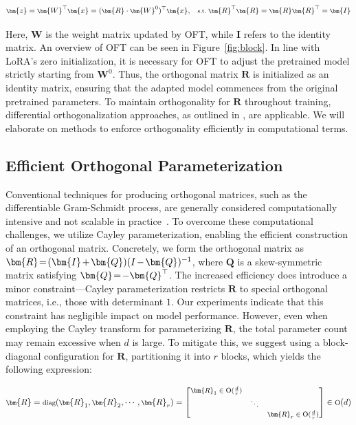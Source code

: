 \begin{equation}\label{eq:oft_general}
    \footnotesize
    \bm{z} = \bm{W}^\top \bm{x} = (\bm{R} \cdot \bm{W}^0)^\top \bm{x},~~~\text{s.t.}~\bm{R}^\top\bm{R} = \bm{R}\bm{R}^\top = \bm{I}
\end{equation}

Here, $\bm{W}$ is the weight matrix updated by OFT, while $\bm{I}$ refers to the identity matrix. An overview of OFT can be seen in Figure~\ref{fig:block}. In line with LoRA’s zero initialization, it is necessary for OFT to adjust the pretrained model strictly starting from $\bm{W}^0$. Thus, the orthogonal matrix $\bm{R}$ is initialized as an identity matrix, ensuring that the adapted model commences from the original pretrained parameters. To maintain orthogonality for $\bm{R}$ throughout training, differential orthogonalization approaches, as outlined in \cite{liu2021orthogonal,lezcano2019cheap}, are applicable. We will elaborate on methods to enforce orthogonality efficiently in computational terms.

\subsection{Efficient Orthogonal Parameterization}\label{sect:eff_ortho}

Conventional techniques for producing orthogonal matrices, such as the differentiable Gram-Schmidt process, are generally considered computationally intensive and not scalable in practice~\cite{liu2021orthogonal}. To overcome these computational challenges, we utilize Cayley parameterization, enabling the efficient construction of an orthogonal matrix. Concretely, we form the orthogonal matrix as $\thickmuskip=2mu \medmuskip=2mu \bm{R} = (\bm{I} + \bm{Q})(I - \bm{Q})^{-1}$, where $\bm{Q}$ is a skew-symmetric matrix satisfying $\thickmuskip=2mu \medmuskip=2mu \bm{Q} = -\bm{Q}^\top$. The increased efficiency does introduce a minor constraint—Cayley parameterization restricts $\bm{R}$ to special orthogonal matrices, i.e., those with determinant $1$. Our experiments indicate that this constraint has negligible impact on model performance. However, even when employing the Cayley transform for parameterizing $\bm{R}$, the total parameter count may remain excessive when $d$ is large. To mitigate this, we suggest using a block-diagonal configuration for $\bm{R}$, partitioning it into $r$ blocks, which yields the following expression:

\begin{equation}
    \footnotesize
    \bm{R} = \text{diag}(\bm{R}_1, \bm{R}_2, \cdots, \bm{R}_r) = \begin{bmatrix}
    \bm{R}_1 \in \text{O}(\frac{d}{r}) &  & \\
    & \ddots & \\
    & & \bm{R}_r \in \text{O}(\frac{d}{r})
    \end{bmatrix} \in \text{O}(d)
\end{equation}

